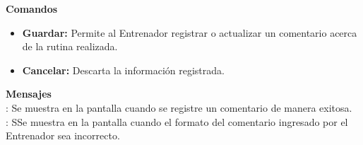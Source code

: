 \textbf{\textcolor[rgb]{0, 0, 0.545098}{Comandos}}
\begin{itemize}
	\item \textbf{\textcolor[rgb]{0, 0, 0.545098}{Guardar:}} Permite al Entrenador registrar o actualizar un comentario acerca de la rutina realizada.
	\item \textbf{\textcolor[rgb]{0, 0, 0.545098}{Cancelar:}} Descarta la información registrada.
\end{itemize}
\vspace{1em}

\textbf{\textcolor[rgb]{0, 0, 0.545098}{Mensajes}}\\
	
\textbf{}: Se muestra en la pantalla  cuando se registre un comentario de manera exitosa.\\

\textbf{}: SSe muestra en la pantalla  cuando el formato del comentario ingresado por el Entrenador sea incorrecto.\\

\clearpage